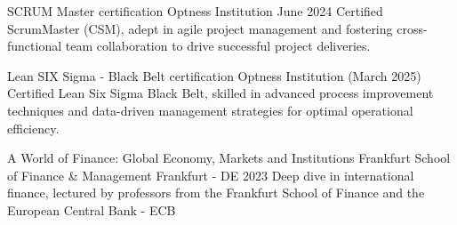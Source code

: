 
\begin{cventries}
  \cventry
  {SCRUM Master certification} %
  {Optness Institution} %
  {}
  {} %
  {June 2024} %
  {
    Certified ScrumMaster (CSM), adept in agile project management and fostering cross-functional team collaboration to drive successful project deliveries.
  }

  \cventry
  {Lean SIX Sigma - Black Belt certification} %
  {Optness Institution} %
  {}
  {} %
  {(March 2025)} %
  {
    Certified Lean Six Sigma Black Belt, skilled in advanced process improvement techniques and data-driven management strategies for optimal operational efficiency.
  }

  \cventry
  {A World of Finance: Global Economy, Markets and Institutions} %
  {Frankfurt School of Finance \& Management} %
  {}
  {Frankfurt - DE} %
  {2023} %
  {
    Deep dive in international finance, lectured by professors from the Frankfurt School of Finance and the European Central Bank - ECB
  }

\end{cventries}
